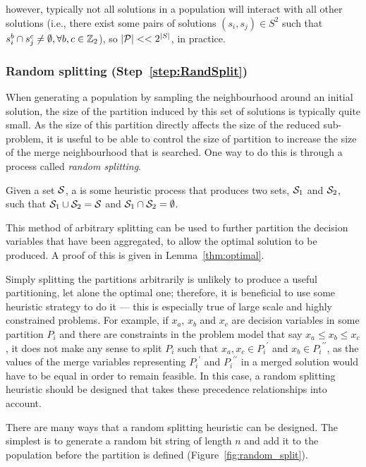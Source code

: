 \documentclass[journal]{IEEEtran}
\begin{document}
however, typically not all solutions in a population will interact with all other solutions (i.e., there exist some pairs of solutions $(s_i,s_j) \in S^2$ such that $s^b_i \cap s^c_j \neq \emptyset, \forall b,c \in \Bin$), so $|{\cal P}| << 2^{|S|}$, in practice.

\subsubsection*{\textbf{Random splitting (Step~\ref{step:RandSplit})}}

When generating a population by sampling the neighbourhood around an initial solution, the size of the partition induced by this set of solutions is typically quite small. As the size of this partition directly affects the size of the reduced sub-problem, it is useful to be able to control the size of partition to increase the size of the merge neighbourhood that is searched. One way to do this is through a process called \emph{random splitting}. 
%
\begin{definition}\label{def:split}
Given a set $\S{S}$, a  is some heuristic process that produces two sets, $\S{S}_1$ and $\S{S}_2$, such that $\S{S}_1 \cup \S{S}_2 = \S{S}$ and $\S{S}_1 \cap \S{S}_2 = \emptyset$.
\end{definition}
%
This method of arbitrary splitting can be used to further partition the decision variables that have been aggregated, to allow the optimal solution to be produced. A proof of this is given in Lemma~\ref{thm:optimal}. 

Simply splitting the partitions arbitrarily is unlikely to produce a useful partitioning, let alone the optimal one; therefore, it is beneficial to use some heuristic strategy to do it --- this is especially true of large scale and highly constrained problems. For example, if $x_a$, $x_b$ and $x_c$ are decision variables in some partition $P_i$ and there are constraints in the problem model that say $x_a \leq x_b \leq x_c$, it does not make any sense to split $P_i$ such that $x_a,x_c \in {P_i}^\prime$ and $x_b \in {P_i}^{\prime\prime}$, as the values of the merge variables representing ${P_i}^\prime$ and ${P_i}^{\prime\prime}$ in a merged solution would have to be equal in order to remain feasible. In this case, a random splitting heuristic should be designed that takes these precedence relationships into account.

\medskip

There are many ways that a random splitting heuristic can be designed. The simplest is to generate a random bit string of length $n$ and add it to the population before the partition is defined (Figure~\ref{fig:random_split}). 
\end{document}
